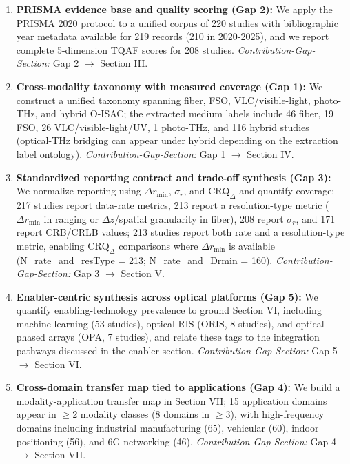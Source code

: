 \documentclass[letterpaper,journal]{IEEEtran}
\begin{document}
\begin{enumerate}
    \item \textbf{PRISMA evidence base and quality scoring (Gap 2):} We apply the PRISMA 2020 protocol to a unified corpus of 220 studies with bibliographic year metadata available for 219 records (210 in 2020-2025), and we report complete 5-dimension TQAF scores for 208 studies. \textit{Contribution-Gap-Section:} Gap 2 $\rightarrow$ Section III.
    \item \textbf{Cross-modality taxonomy with measured coverage (Gap 1):} We construct a unified taxonomy spanning fiber, FSO, VLC/visible-light, photo-THz, and hybrid O-ISAC; the extracted medium labels include 46 fiber, 19 FSO, 26 VLC/visible-light/UV, 1 photo-THz, and 116 hybrid studies (optical-THz bridging can appear under hybrid depending on the extraction label ontology). \textit{Contribution-Gap-Section:} Gap 1 $\rightarrow$ Section IV.
    \item \textbf{Standardized reporting contract and trade-off synthesis (Gap 3):} We normalize reporting using $\Delta r_{\min}$, $\sigma_r$, and $\text{CRQ}_{\Delta}$ and quantify coverage: 217 studies report data-rate metrics, 213 report a resolution-type metric ($\Delta r_{\min}$ in ranging or $\Delta z$/spatial granularity in fiber), 208 report $\sigma_r$, and 171 report CRB/CRLB values; 213 studies report both rate and a resolution-type metric, enabling $\text{CRQ}_{\Delta}$ comparisons where $\Delta r_{\min}$ is available (N\_rate\_and\_resType = 213; N\_rate\_and\_Drmin = 160). \textit{Contribution-Gap-Section:} Gap 3 $\rightarrow$ Section V.
    \item \textbf{Enabler-centric synthesis across optical platforms (Gap 5):} We quantify enabling-technology prevalence to ground Section VI, including machine learning (53 studies), optical RIS (ORIS, 8 studies), and optical phased arrays (OPA, 7 studies), and relate these tags to the integration pathways discussed in the enabler section. \textit{Contribution-Gap-Section:} Gap 5 $\rightarrow$ Section VI.
    \item \textbf{Cross-domain transfer map tied to applications (Gap 4):} We build a modality-application transfer map in Section VII; 15 application domains appear in $\ge$2 modality classes (8 domains in $\ge$3), with high-frequency domains including industrial manufacturing (65), vehicular (60), indoor positioning (56), and 6G networking (46). \textit{Contribution-Gap-Section:} Gap 4 $\rightarrow$ Section VII.
\end{enumerate}
\end{document}
